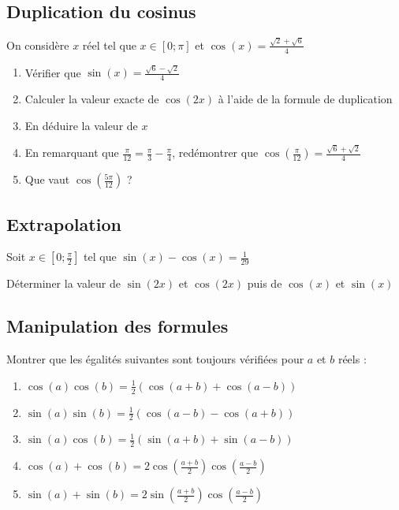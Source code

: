 \documentclass[oneside,12pt]{book}          %
\begin{document}
\subsection{Duplication du cosinus}
On considère $x$ réel tel que $x\in [0;\pi]$ et $\cos(x)=\frac{\sqrt{2}+\sqrt{6}}{4}$ 
\begin{enumerate}
    \item Vérifier que $\sin(x)=\frac{\sqrt{6}-\sqrt{2}}{4}$
    \item Calculer la valeur exacte de $\cos(2x)$ à l'aide de la formule de duplication
    \item En déduire la valeur de $x$
    \item En remarquant que $\frac{\pi}{12}=\frac{\pi}{3}-\frac{\pi}{4}$, redémontrer que $\cos\left(\frac{\pi}{12}\right)=\frac{\sqrt{6}+\sqrt{2}}{4}$
    \item Que vaut $\cos\left(\frac{5\pi}{12}\right)$ ?
\end{enumerate}



\subsection{Extrapolation}
Soit $x\in\left[0;\frac{\pi}{2}\right]$ tel que $\sin(x)-\cos(x)=\frac{1}{29}$

Déterminer la valeur de $\sin(2x)$ et $\cos(2x)$ puis de $\cos(x)$ et $\sin(x)$




\subsection{Manipulation des formules}
Montrer que les égalités suivantes sont toujours vérifiées pour $a$ et $b$ réels :
\begin{enumerate}
	\item $\cos(a)\cos(b)=\frac{1}{2}\left(\cos(a+b)+\cos(a-b)\right)$
	\item $\sin(a)\sin(b)=\frac{1}{2}\left(\cos(a-b)-\cos(a+b)\right)$
	\item $\sin(a)\cos(b)=\frac{1}{2}\left(\sin(a+b)+\sin(a-b)\right)$
	\item $\cos(a)+\cos(b)=2\cos\left(\frac{a+b}{2}\right)\cos\left(\frac{a-b}{2}\right)$
	\item $\sin(a)+\sin(b)=2\sin\left(\frac{a+b}{2}\right)\cos\left(\frac{a-b}{2}\right)$
\end{enumerate}
\end{document}
